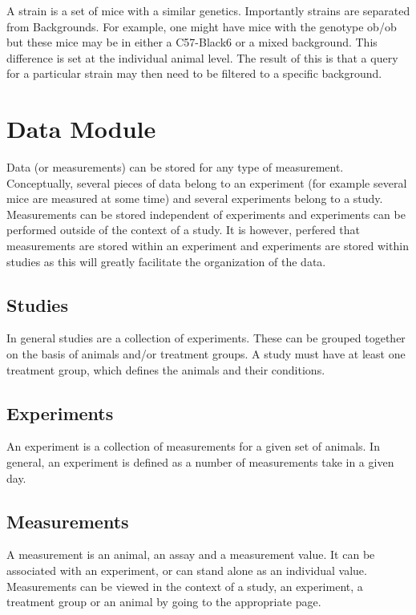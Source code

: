 \documentclass[letterpaper,10pt,english]{sphinxmanual}
\begin{document}
A strain is a set of mice with a similar genetics.  Importantly strains are separated from Backgrounds.  For example, one might have mice with the genotype ob/ob but these mice may be in either a C57-Black6 or a mixed background.  This difference is set at the individual animal level.
The result of this is that a query for a particular strain may then need to be filtered to a specific background.


\section{Data Module}

Data (or measurements) can be stored for any type of measurement.  Conceptually, several pieces of data belong to an experiment (for example several mice are measured at some time) and several experiments belong to a study.  Measurements can be stored independent of experiments and experiments can be performed outside of the context of a study.  It is however, perfered that measurements are stored within an experiment and experiments are stored within studies as this will greatly facilitate the organization of the data.


\subsection{Studies}

In general studies are a collection of experiments.  These can be grouped together on the basis of animals and/or treatment groups.  A study must have at least one treatment group, which defines the animals and their conditions.


\subsection{Experiments}

An experiment is a collection of measurements for a given set of animals.  In general, an experiment is defined as a number of measurements take in a given day.


\subsection{Measurements}

A measurement is an animal, an assay and a measurement value.  It can be associated with an experiment, or can stand alone as an individual value.  Measurements can be viewed in the context of a study, an experiment, a treatment group or an animal by going to the appropriate page.
\end{document}
